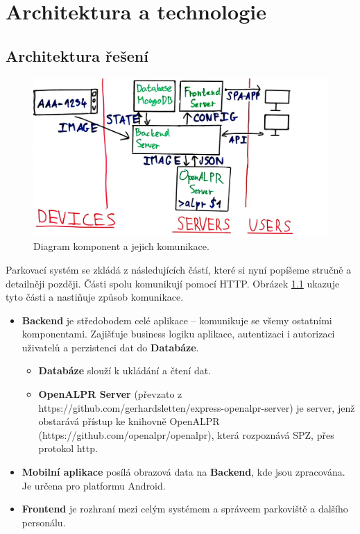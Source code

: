 
\chapter{Architektura a technologie}

\section{Architektura řešení} \label{architektura_reseni}

\begin{figure} \centering
  \includegraphics[width=145mm]{../img/architecture_drawing.jpg}
  \caption{Diagram komponent a jejich komunikace.}
  \label{fig:architecture_drawing}
\end{figure}

Parkovací systém se zkládá z následujících částí, které si nyní popíšeme stručně a detailněji později.
Části spolu komunikují pomocí HTTP.
Obrázek \ref{fig:architecture_drawing} ukazuje tyto části a nastiňuje způsob komunikace.

\begin{itemize}
  \item \textbf{Backend} je středobodem celé aplikace -- komunikuje se všemy ostatními komponentami.
        Zajišťuje business logiku aplikace, autentizaci i autorizaci uživatelů a perzistenci dat do \textbf{Databáze}.
  \begin{itemize}
    \item \textbf{Databáze} slouží k ukládání a čtení dat.
    \item \textbf{OpenALPR Server} (převzato z https://github.com/gerhardsletten/express-openalpr-server) je server, jenž obstarává přístup
          ke knihovně OpenALPR (https://github.com/openalpr/openalpr), která rozpoznává SPZ, přes protokol http.
  \end{itemize}
  \item \textbf{Mobilní aplikace} posílá obrazová data na \textbf{Backend}, kde jsou zpracována. Je určena pro platformu Android.
  \item \textbf{Frontend} je rozhraní mezi celým systémem a správcem parkoviště a dalšího personálu.
\end{itemize}


